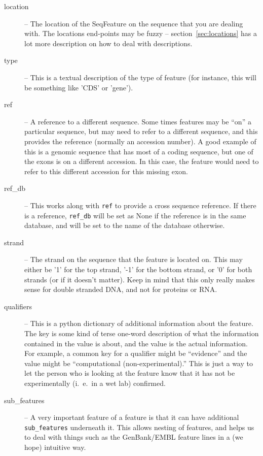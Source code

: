 \documentclass{report}
\begin{document}
\begin{description}
  \item[location] -- The location of the SeqFeature on the sequence that you are dealing with. The locations end-points may be fuzzy -- section~\ref{sec:locations} has a lot more description on how to deal with descriptions.

  \item[type] -- This is a textual description of the type of feature (for instance, this will be something like 'CDS' or 'gene').

  \item[ref] -- A reference to a different sequence. Some times features may be ``on'' a particular sequence, but may need to refer to a different sequence, and this provides the reference (normally an accession number). A good example of this is a genomic sequence that has most of a coding sequence, but one of the exons is on a different accession. In this case, the feature would need to refer to this different accession for this missing exon.

  \item[ref\_db] -- This works along with \verb|ref| to provide a cross sequence reference. If there is a reference, \verb|ref_db| will be set as None if the reference is in the same database, and will be set to the name of the database otherwise.

  \item[strand] -- The strand on the sequence that the feature is located on. This may either be '1' for the top strand, '-1' for the bottom strand, or '0' for both strands (or if it doesn't matter). Keep in mind that this only really makes sense for double stranded DNA, and not for proteins or RNA. 

  \item[qualifiers] -- This is a python dictionary of additional information about the feature. The key is some kind of terse one-word description of what the information contained in the value is about, and the value is the actual information. For example, a common key for a qualifier might be ``evidence'' and the value might be ``computational (non-experimental).'' This is just a way to let the person who is looking at the feature know that it has not be experimentally (i.~e.~in a wet lab) confirmed.
  
  \item[sub\_features] -- A very important feature of a feature is that it can have additional \verb|sub_features| underneath it. This allows nesting of features, and helps us to deal with things such as the GenBank/EMBL feature lines in a (we hope) intuitive way.
\end{description}
\end{document}
